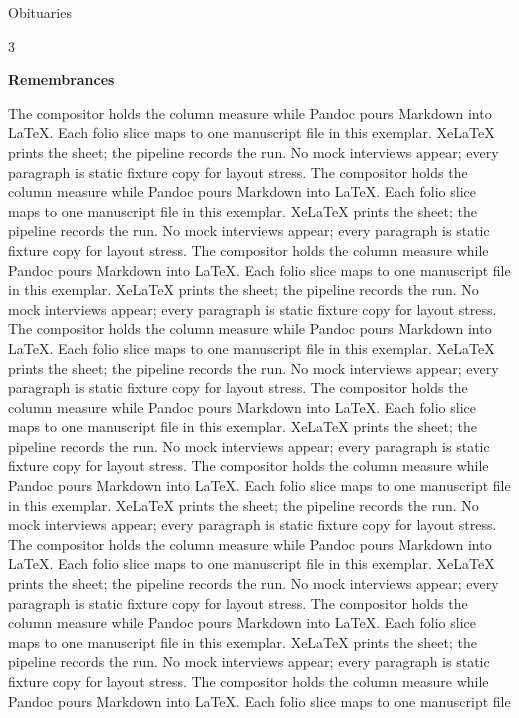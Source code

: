 \documentclass[
  ignorenonframetext,
]{beamer}
\author{\texorpdfstring{}{}}
\date{}
\begin{document}
\begin{frame}{Obituaries}
\protect{}\label{obituaries}
\begin{multicols}{3}

\textbf{Remembrances}

The compositor holds the column measure while Pandoc pours Markdown into
LaTeX. Each folio slice maps to one manuscript file in this exemplar.
XeLaTeX prints the sheet; the pipeline records the run. No mock
interviews appear; every paragraph is static fixture copy for layout
stress. The compositor holds the column measure while Pandoc pours
Markdown into LaTeX. Each folio slice maps to one manuscript file in
this exemplar. XeLaTeX prints the sheet; the pipeline records the run.
No mock interviews appear; every paragraph is static fixture copy for
layout stress. The compositor holds the column measure while Pandoc
pours Markdown into LaTeX. Each folio slice maps to one manuscript file
in this exemplar. XeLaTeX prints the sheet; the pipeline records the
run. No mock interviews appear; every paragraph is static fixture copy
for layout stress. The compositor holds the column measure while Pandoc
pours Markdown into LaTeX. Each folio slice maps to one manuscript file
in this exemplar. XeLaTeX prints the sheet; the pipeline records the
run. No mock interviews appear; every paragraph is static fixture copy
for layout stress. The compositor holds the column measure while Pandoc
pours Markdown into LaTeX. Each folio slice maps to one manuscript file
in this exemplar. XeLaTeX prints the sheet; the pipeline records the
run. No mock interviews appear; every paragraph is static fixture copy
for layout stress. The compositor holds the column measure while Pandoc
pours Markdown into LaTeX. Each folio slice maps to one manuscript file
in this exemplar. XeLaTeX prints the sheet; the pipeline records the
run. No mock interviews appear; every paragraph is static fixture copy
for layout stress. The compositor holds the column measure while Pandoc
pours Markdown into LaTeX. Each folio slice maps to one manuscript file
in this exemplar. XeLaTeX prints the sheet; the pipeline records the
run. No mock interviews appear; every paragraph is static fixture copy
for layout stress. The compositor holds the column measure while Pandoc
pours Markdown into LaTeX. Each folio slice maps to one manuscript file
in this exemplar. XeLaTeX prints the sheet; the pipeline records the
run. No mock interviews appear; every paragraph is static fixture copy
for layout stress. The compositor holds the column measure while Pandoc
pours Markdown into LaTeX. Each folio slice maps to one manuscript file

\end{multicols}
\end{frame}
\end{document}
